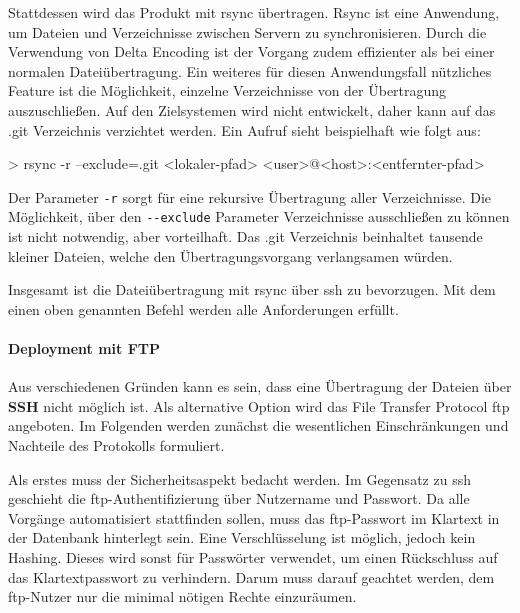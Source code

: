 Stattdessen wird das Produkt mit rsync übertragen. Rsync ist eine Anwendung, um Dateien und Verzeichnisse zwischen Servern zu synchronisieren. Durch die Verwendung von Delta Encoding ist der Vorgang zudem effizienter als bei einer normalen Dateiübertragung. Ein weiteres für diesen Anwendungsfall nützliches Feature ist die Möglichkeit, einzelne Verzeichnisse von der Übertragung auszuschließen. Auf den Zielsystemen wird nicht entwickelt, daher kann auf das .git Verzeichnis verzichtet werden. Ein Aufruf sieht beispielhaft wie folgt aus:

> rsync -r --exclude=.git <lokaler-pfad> <user>@<host>:<entfernter-pfad>

Der Parameter \lstinline!-r! sorgt für eine rekursive Übertragung aller Verzeichnisse. Die Möglichkeit, über den \lstinline!--exclude! Parameter Verzeichnisse ausschließen zu können ist nicht notwendig, aber vorteilhaft. Das .git Verzeichnis beinhaltet tausende kleiner Dateien, welche den Übertragungsvorgang verlangsamen würden.

Insgesamt ist die Dateiübertragung mit rsync über \gls{ssh} zu bevorzugen. Mit dem einen oben genannten Befehl werden alle Anforderungen erfüllt.


\paragraph{Deployment mit FTP} %
\label{par:deployment_mit_ftp}

Aus verschiedenen Gründen kann es sein, dass eine Übertragung der Dateien über \textbf{SSH} nicht möglich ist. Als alternative Option wird das File Transfer Protocol \gls{ftp} angeboten. Im Folgenden werden zunächst die wesentlichen Einschränkungen und Nachteile des Protokolls formuliert.

Als erstes muss der Sicherheitsaspekt bedacht werden. Im Gegensatz zu \gls{ssh} geschieht die \gls{ftp}-Authentifizierung über Nutzername und Passwort. Da alle Vorgänge automatisiert stattfinden sollen, muss das \gls{ftp}-Passwort im Klartext in der Datenbank hinterlegt sein. Eine Verschlüsselung ist möglich, jedoch kein Hashing. Dieses wird sonst für Passwörter verwendet, um einen Rückschluss auf das Klartextpasswort zu verhindern. Darum muss darauf geachtet werden, dem \gls{ftp}-Nutzer nur die minimal nötigen Rechte einzuräumen.

